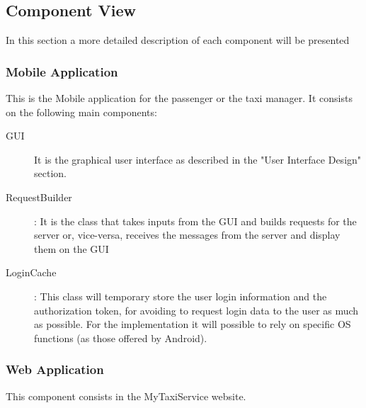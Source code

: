 \documentclass[11pt, a4paper,titlepage]{article}
\newcommand{\productname}{MyTaxiService }
\begin{document}
\subsection{Component View}
In this section a more detailed description of each component will be presented
 \subsubsection{Mobile Application}
	 This is the Mobile application for the passenger or the taxi manager. It consists on the following main components:
	 \begin{description}
	 	\item[GUI] It is the graphical user interface as described in the "User Interface Design" section.
	 	\item[RequestBuilder]: It is the class that takes inputs from the GUI and builds requests for the server or, vice-versa, receives the messages from the server and display them on the GUI
	 	\item[LoginCache]: This class will temporary store the user login information and the authorization token, for avoiding to request login data to the user as much as possible. For the implementation it will possible to rely on specific OS functions (as those offered by Android).
	 \end{description}
 \subsubsection{Web Application}
	 This component consists in the \productname website.
\end{document}
